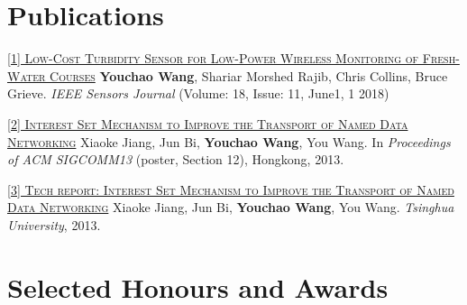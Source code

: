 \documentclass[11pt,a4paper]{moderncv}
\begin{document}
\vspace*{-0.0cm}

\section{Publications}

\href{https://ieeexplore.ieee.org/document/8337739}{\textsc{[1] Low-Cost Turbidity Sensor for Low-Power Wireless Monitoring of Fresh-Water Courses}}
\newline  \textbf{Youchao Wang}, Shariar Morshed Rajib, Chris Collins, Bruce Grieve. \textit{IEEE Sensors Journal} (Volume: 18, Issue: 11, June1, 1 2018)

\href{https://ndnsim.net/2.3/ndnsim-research-papers.html}{\textsc{[2] Interest Set Mechanism to Improve the Transport of Named Data Networking}}
\newline  Xiaoke Jiang, Jun Bi, \textbf{Youchao Wang}, You Wang. In \textit{Proceedings of ACM SIGCOMM13} (poster, Section 12), Hongkong, 2013. 

\href{http://netarchlab.tsinghua.edu.cn/~shock/THU-NetArchLab-ICN-TR-ISTSET-20130517.pdf}{\textsc{[3] Tech report: Interest Set Mechanism to Improve the Transport of Named Data Networking}}
\newline  Xiaoke Jiang, Jun Bi, \textbf{Youchao Wang}, You Wang.\textit{ Tsinghua University}, 2013.  

\vspace*{-0.2cm}

\section{Selected Honours and Awards}
\end{document}
